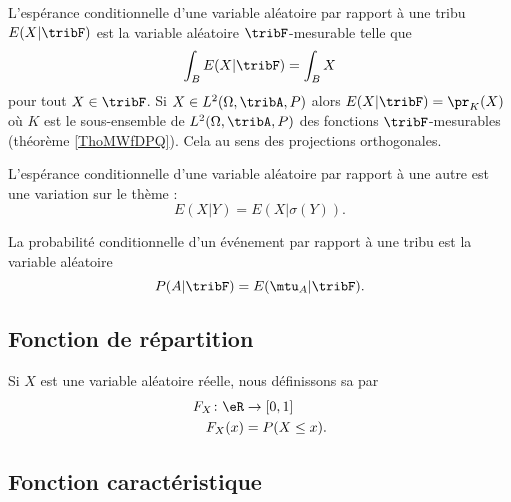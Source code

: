 L'espérance conditionnelle d'une variable aléatoire par rapport à une tribu \( E(X|\tribF)\) est la variable aléatoire \( \tribF\)-mesurable telle que
\begin{equation}
    \int_BE(X|\tribF)=\int_BX
\end{equation}
pour tout \( X\in \tribF\). Si \( X\in L^2(\Omega,\tribA,P)\) alors \( E(X|\tribF)=\pr_K(X)\) où \( K\) est le sous-ensemble de \( L^2(\Omega,\tribA,P)\) des fonctions \( \tribF\)-mesurables (théorème \ref{ThoMWfDPQ}). Cela au sens des projections orthogonales.

L'espérance conditionnelle d'une variable aléatoire par rapport à une autre est une variation sur le thème :
\begin{equation}
    E(X|Y)=E(X|\sigma(Y)).
\end{equation}

La probabilité conditionnelle d'un événement par rapport à une tribu est la variable aléatoire
\begin{equation}
    P(A|\tribF)=E(\mtu_A|\tribF).
\end{equation}

\subsection{Fonction de répartition}

Si \( X\) est une variable aléatoire réelle, nous définissons sa  par
\begin{equation}
    \begin{aligned}
        F_X\colon \eR&\to \mathopen[ 0 , 1 \mathclose] \\
        F_X(x)&=P(X\leq x). 
    \end{aligned}
\end{equation}

\subsection{Fonction caractéristique}

